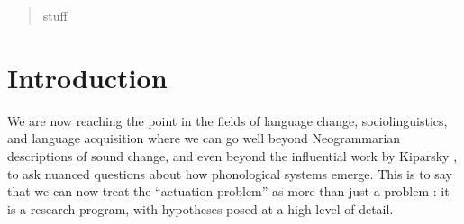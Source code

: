 \date{Received: date / Accepted: date}


\maketitle

\begin{abstract}
stuff
\end{abstract}

\section{Introduction}
\label{intro}

We are now reaching the point in the fields of language change, sociolinguistics, and language acquisition where we can go well beyond Neogrammarian descriptions of sound change, and even beyond the influential work by Kiparsky , to ask nuanced questions about how phonological systems emerge. This is to say that we can now treat the ``actuation problem'' as more than just a problem \citep{wlh1968}: it is a research program, with hypotheses posed at a high level of detail.

